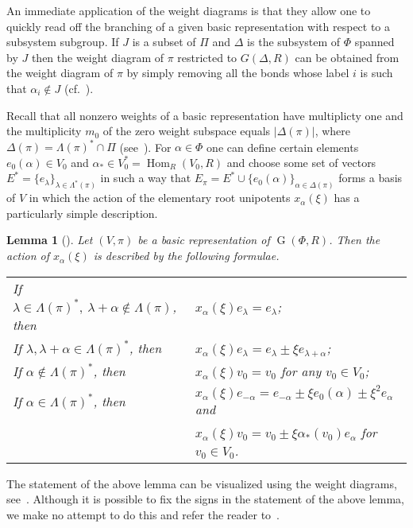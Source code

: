 \documentclass[oneside, 12pt]{amsart}
\theoremstyle{plain}
\numberwithin{equation}{section}
\newtheorem{lemma}{Lemma}
\numberwithin{lemma}{section}
\theoremstyle{definition}
\theoremstyle{remark}
\DeclareMathOperator{\G}{G}
\DeclareMathOperator{\Hom}{Hom}
\begin{document}
An immediate application of the weight diagrams is that they allow one to quickly read off the branching of a given basic representation with respect to a subsystem subgroup.
If $J$ is a subset of $\Pi$ and $\Delta$ is the subsystem of $\Phi$ spanned by $J$ then the weight diagram of $\pi$ restricted to $G(\Delta, R)$ can be obtained
from the weight diagram of $\pi$ by simply removing all the bonds whose label $i$ is such that $\alpha_i\not\in J$ (cf.~\cite[\S~2.7]{PSV98}).
 
Recall that all nonzero weights of a basic representation have multiplicty one and the multiplicity $m_0$ of the zero weight subspace equals $|\Delta(\pi)|$, where $\Delta(\pi)= \Lambda(\pi)^* \cap \Pi$ (see~\cite[Lemma~2.1]{Ma69}).
For $\alpha \in \Phi$ one can define certain elements $e_0(\alpha) \in V_0$ and $\alpha_* \in V_0^* = \Hom_R(V_0, R)$
and choose some set of vectors $E^* = \{ e_\lambda \}_{\lambda \in \Lambda^*(\pi)}$ in such a way that 
$E_\pi = E^* \cup \{ e_0(\alpha) \}_{\alpha \in \Delta(\pi)}$ forms a basis of $V$ in which the action of the elementary root unipotents
$x_\alpha(\xi)$ has a particularly simple description.

\begin{lemma}[{\cite[Lemma~2.3]{Ma69}}]\label{lemma:Matsumoto}
Let $(V, \pi)$ be a basic representation of $\G(\Phi, R)$.
Then the action of $x_\alpha(\xi)$ is described by the following formulae.
\newline \begin{tabular}{ll}
If $\lambda\in\Lambda(\pi)^*, \ \lambda+\alpha\notin\Lambda(\pi)$, then & $x_\alpha(\xi)e_\lambda=e_\lambda$; \\
If $\lambda, \lambda+\alpha\in\Lambda(\pi)^*$, then & $x_\alpha(\xi)e_\lambda=e_\lambda\pm\xi e_{\lambda+\alpha}$; \\
If $\alpha\notin\Lambda(\pi)^*$, then & $x_\alpha(\xi)v_0=v_0$ for any $v_0\in V_0$; \\
If $\alpha\in\Lambda(\pi)^*$, then & $x_\alpha(\xi)e_{-\alpha} = e_{-\alpha}\pm\xi e_0(\alpha)\pm\xi^2 e_\alpha$ and \\
                                   & $x_\alpha(\xi)v_0         = v_0\pm\xi\alpha_*(v_0)e_\alpha$ for $v_0 \in V_0$.
\end{tabular} \end{lemma}
The statement of the above lemma can be visualized using the weight diagrams, see~\cite[\S~3.4]{PSV98}.
Although it is possible to fix the signs in the statement of the above lemma, we make no attempt to do this and refer the reader to~\cite{V08}.
\end{document}

